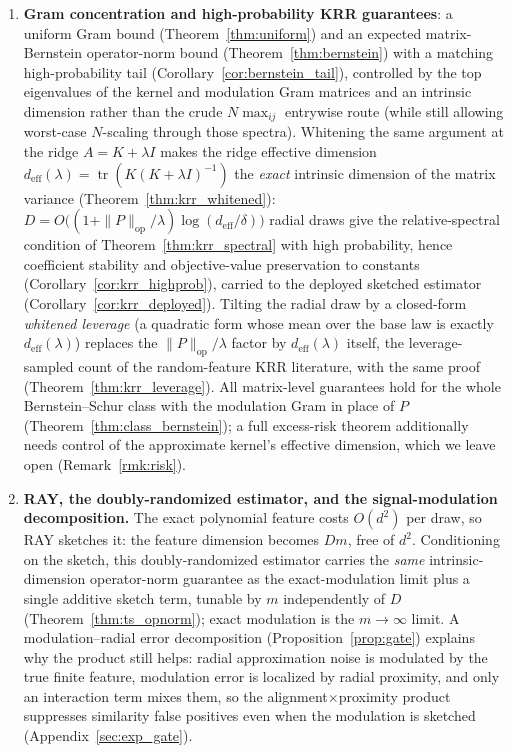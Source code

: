 \documentclass{article}
\begin{document}
\begin{enumerate}[label=(\roman*),leftmargin=2em]
\item \textbf{Gram concentration and high-probability KRR guarantees}: a uniform Gram bound (Theorem~\ref{thm:uniform}) and an expected matrix-Bernstein operator-norm bound (Theorem~\ref{thm:bernstein}) with a matching high-probability tail (Corollary~\ref{cor:bernstein_tail}), controlled by the top eigenvalues of the kernel and modulation Gram matrices and an intrinsic dimension rather than the crude $N\max_{ij}$ entrywise route (while still allowing worst-case $N$-scaling through those spectra). Whitening the same argument at the ridge $A=K+\lambda I$ makes the ridge effective dimension $d_{\mathrm{eff}}(\lambda)=\operatorname{tr}(K(K+\lambda I)^{-1})$ the \emph{exact} intrinsic dimension of the matrix variance (Theorem~\ref{thm:krr_whitened}): $D=O\bigl((1+\|P\|_{\mathrm{op}}/\lambda)\log(d_{\mathrm{eff}}/\delta)\bigr)$ radial draws give the relative-spectral condition of Theorem~\ref{thm:krr_spectral} with high probability, hence coefficient stability and objective-value preservation to constants (Corollary~\ref{cor:krr_highprob}), carried to the deployed sketched estimator (Corollary~\ref{cor:krr_deployed}). Tilting the radial draw by a closed-form \emph{whitened leverage} (a quadratic form whose mean over the base law is exactly $d_{\mathrm{eff}}(\lambda)$) replaces the $\|P\|_{\mathrm{op}}/\lambda$ factor by $d_{\mathrm{eff}}(\lambda)$ itself, the leverage-sampled count of the random-feature KRR literature, with the same proof (Theorem~\ref{thm:krr_leverage}). All matrix-level guarantees hold for the whole Bernstein--Schur class with the modulation Gram in place of $P$ (Theorem~\ref{thm:class_bernstein}); a full excess-risk theorem additionally needs control of the approximate kernel's effective dimension, which we leave open (Remark~\ref{rmk:risk}).
\item \textbf{RAY, the doubly-randomized estimator, and the signal-modulation decomposition.} The exact polynomial feature costs $O(d^2)$ per draw, so RAY sketches it: the feature dimension becomes $Dm$, free of $d^2$. Conditioning on the sketch, this doubly-randomized estimator carries the \emph{same} intrinsic-dimension operator-norm guarantee as the exact-modulation limit plus a single additive sketch term, tunable by $m$ independently of $D$ (Theorem~\ref{thm:ts_opnorm}); exact modulation is the $m\to\infty$ limit. A modulation--radial error decomposition (Proposition~\ref{prop:gate}) explains why the product still helps: radial approximation noise is modulated by the true finite feature, modulation error is localized by radial proximity, and only an interaction term mixes them, so the alignment$\times$proximity product suppresses similarity false positives even when the modulation is sketched (Appendix~\ref{sec:exp_gate}).

\end{enumerate}
\end{document}
